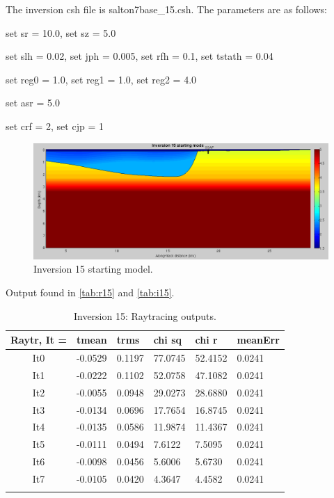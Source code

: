 \documentclass[fontsize=11pt, %
                             paper=a4, %
                             twoside, %
                             captions=tableheading,
                             index=totoc,
                             hyperref]{labbook}
\begin{document}
\begin{addmargin}[4cm]{0cm}
The inversion csh file is salton7base\_15.csh.  The parameters are as follows:

set sr = 10.0, set sz = 5.0

set slh =  0.02,
set jph =  0.005,
set rfh =  0.1,
set tstath = 0.04

set reg0 =    1.0, set reg1 =    1.0, set reg2 =   4.0

set asr = 5.0

set crf = 2, set cjp = 1

\begin{figure}[h!]
\raggedleft
\includegraphics[scale=0.4,keepaspectratio=true]{figs/inv15_0.png}
\caption{Inversion 15 starting model.}
\label{fig:inv15start}
\end{figure}

\clearpage{}

Output found in \autoref{tab:r15} and \autoref{tab:i15}.

\begin{table}[!ht]
\label{tab:r15}
\raggedleft
\begin{tabular}{c l l l l l}
\toprule
\textbf{Raytr, It = } & \textbf{tmean} & \textbf{trms} & \textbf{chi sq} & \textbf{chi r} & \textbf{meanErr} \\
\toprule
It0 & -0.0529 & 0.1197 & 77.0745 & 52.4152 & 0.0241\\
It1 & -0.0222 & 0.1102 & 52.0758 & 47.1082 & 0.0241\\
It2 & -0.0055 & 0.0948 & 29.0273 & 28.6880 & 0.0241\\
It3 & -0.0134 & 0.0696 & 17.7654 & 16.8745 & 0.0241\\
It4 & -0.0135 & 0.0586 & 11.9874 & 11.4367 & 0.0241\\
It5 & -0.0111 & 0.0494 & 7.6122 & 7.5095 & 0.0241\\
It6 & -0.0098 & 0.0456 & 5.6006 & 5.6730 & 0.0241\\
It7 & -0.0105 & 0.0420 & 4.3647 & 4.4582 & 0.0241\\
\bottomrule\\
\end{tabular}
\caption{Inversion 15: Raytracing outputs.}
\end{table}


\end{addmargin}
\end{document}
